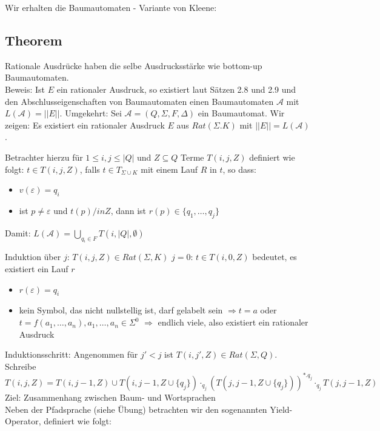 \documentclass[titlepage]{article}
\begin{document}
Wir erhalten die \glqq Baumautomaten \grqq - Variante von Kleene:\\

\subsection{Theorem}

Rationale Ausdr\"ucke haben die selbe Ausdrucksst\"arke wie bottom-up Baumautomaten.\\
Beweis: Ist $E$ ein rationaler Ausdruck, so existiert laut S\"atzen 2.8 und 2.9 und den 
Abschlusseigenschaften von Baumautomaten einen Baumautomaten $\mathcal{A}$ mit $L(\mathcal{A}) = ||E||$.
Umgekehrt: Sei $\mathcal{A} = (Q, \Sigma, F, \Delta)$ ein Baumautomat.
Wir zeigen: Es existiert ein rationaler Ausdruck $E$ aus $Rat(\Sigma. K)$ mit $||E|| = L(\mathcal{A})$.

Betrachter hierzu f\"ur $1 \leq i,j \leq |Q|$ und $Z \subseteq Q$ Terme $T(i, j, Z)$ definiert wie folgt:
$t \in T(i, j, Z)$, falls $t \in T_{\Sigma \cup K}$ mit einem Lauf $R$ in $t$, so dass:
\begin{itemize}
	\item $v(\varepsilon) = q_i$
	\item ist $p \neq \varepsilon$ und $t(p) /in Z$, dann ist $r(p) \in \{q_1, \dots, q_j\}$
\end{itemize}

Damit: $L(\mathcal{A}) = \bigcup\limits_{q_i \in F} T(i, |Q|, \emptyset)$

Induktion \"uber $j$: $T(i, j, Z) \in Rat(\Sigma, K)$
$j = 0$: $t \in T(i, 0, Z)$ bedeutet, es existiert ein Lauf $r$
\begin{itemize}
	\item $r(\varepsilon) = q_i$
	\item kein Symbol, das nicht nullstellig ist, darf gelabelt sein
		$\Rightarrow t = a$ oder $t = f(a_1, \dots, a_n), a_1, \dots, a_n \in \Sigma^0$
		$\Rightarrow$ endlich viele, also existiert ein rationaler Ausdruck
\end{itemize}

Induktionsschritt: Angenommen f\"ur $j' < j$ ist $T(i, j', Z) \in Rat(\Sigma, Q)$.\\
Schreibe $T(i, j, Z) = T(i, j-1, Z) \cup T(i, j-1, Z \cup \{q_j\}) \cdot_{q_j} (T(j, j-1, Z \cup \{q_j\}))^{\ast . q_j} \cdot_{q_j} T(j, j-1, Z)$\\

Ziel: Zusammenhang zwischen Baum- und Wortsprachen\\
Neben der Pfadsprache (siehe \"Ubung) betrachten wir den sogenannten Yield-Operator, definiert wie folgt:
\end{document}
